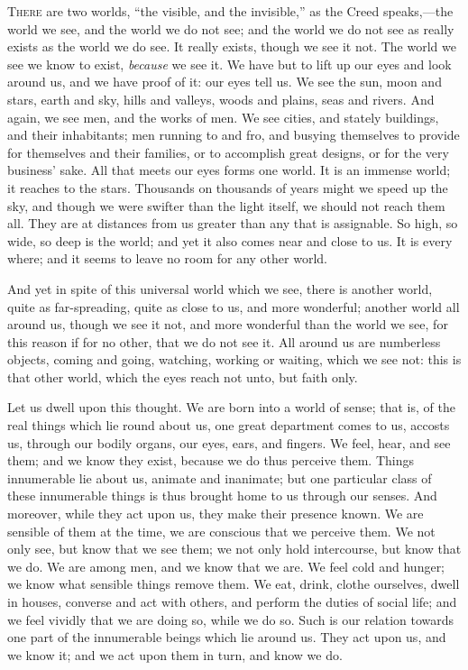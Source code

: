 T\textsc{here} are two worlds, ``the visible, and the invisible,''
as the Creed speaks,—the world we see, and the world we do not see;
and the world we do not see as really exists as the world we do see.
It really exists, though we see it not. The world we see we know to
exist, \emph{because} we see it. We have but to lift up our eyes and
look around us, and we have proof of it: our eyes tell us. We see the
sun, moon and stars, earth and sky, hills and valleys, woods and
plains, seas and rivers. And again, we see men, and the works of men.
We see cities, and stately buildings, and their inhabitants; men
running to and fro, and busying themselves to provide for themselves
and their families, or to accomplish great designs, or for the very
business' sake. All that meets our eyes forms one world. It is an
immense world; it reaches to the stars. Thousands on thousands of
years might we speed up the sky, and though we were swifter than the
light itself, we should not reach them all. They are at distances from
us greater than any that is assignable. So high, so wide, so deep is
the world; and yet it also comes near and close to us. It is every
where; and it seems to leave no room for any other world.

And yet in spite of this universal world which we see, there is
another world, quite as far-spreading, quite as close to us, and more
wonderful; another world all around us, though we see it not, and more
wonderful than the world we see, for this reason if for no other, that
we do not see it. All around us are numberless objects, coming and
going, watching, working or waiting, which we see not: this is that
other world, which the eyes reach not unto, but faith only.

Let us dwell upon this thought. We are born into a world of sense;
that is, of the real things which lie round about us, one great
department comes to us, accosts us, through our bodily organs, our
eyes, ears, and fingers. We feel, hear, and see them; and we know they
exist, because we do thus perceive them. Things innumerable lie about
us, animate and inanimate; but one particular class of these
innumerable things is thus brought home to us through our senses. And
moreover, while they act upon us, they make their presence known. We
are sensible of them at the time, we are conscious that we perceive
them. We not only see, but know that we see them; we not only hold
intercourse, but know that we do. We are among men, and we know that
we are. We feel cold and hunger; we know what sensible things remove
them. We eat, drink, clothe ourselves, dwell in houses, converse and
act with others, and perform the duties of social life; and we feel
vividly that we are doing so, while we do so. Such is our relation
towards one part of the innumerable beings which lie around us. They
act upon us, and we know it; and we act upon them in turn, and know we
do.

